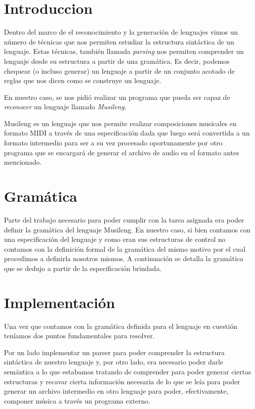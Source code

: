 \section{Introduccion}

Dentro del marco de el reconocimiento y la generación de lenguajes vimos un número de técnicas que nos permiten
estudiar la estructura sintáctica de un lenguaje. Estas técnicas, también llamada \emph{parsing} nos permiten
comprender un lenguaje desde su estructura a partir de una gramática. Es decir, podemos chequear (o incluso generar)
un lenguaje a partir de un conjunto acotado de reglas que nos dicen como se construye un lenguaje.

En nuestro caso, se nos pidió realizar un programa que pueda ser capaz de \emph{reconocer} un lenguaje llamado \emph{Musileng}.

Musileng es un lenguaje que nos permite realizar composiciones musicales en formato MIDI a través de una especificación dada que luego
será convertida a un formato intermedio para ser a su vez procesado oportunamente por otro programa que se encargará de generar el archivo
de audio en el formato antes mencionado.

\section{Gramática}

Parte del trabajo necesario para poder cumplir con la tarea asignada era poder definir la gramática del lenguaje Musileng.
En nuestro caso, si bien contamos con una especificación del lenguaje y como eran sus estructuras de control no contamos con la definición
formal de la gramática del mismo motivo por el cual procedimos a definirla nosotros mismos. A continuación se detalla la gramática que
se dedujo a partir de la especificación brindada.



\section{Implementación}

Una vez que contamos con la gramática definida para el lenguaje en cuestión teníamos dos puntos fundamentales para resolver. 

Por un lado implementar un parser para poder comprender la estructura sintáctica de nuestro lenguaje y, por otro lado, 
era necesario poder darle semántica a lo que estabamos tratando de comprender para poder generar ciertas estructuras y recavar 
cierta información necesaria de lo que se leía para poder generar un archivo intermedio en otro lenguaje para poder, efectivamente,
componer música a través un programa externo.

